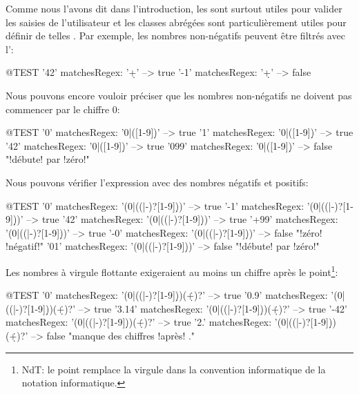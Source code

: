 \documentclass[a4paper,10pt,twoside]{book}
\begin{document}
{Comme nous l'avons dit dans l'introduction, les \expregs sont surtout
utiles pour valider les saisies de l'utilisateur et les classes
abrégées sont particulièrement utiles pour définir de telles \expregs.
Par exemple, les nombres non-négatifs peuvent être filtrés avec
l'\expreg \ct{\d+}:

\begin{code}{@TEST}
'42' matchesRegex: '\d+' --> true
'-1' matchesRegex: '\d+' --> false
\end{code}

Nous pouvons encore vouloir préciser que les nombres non-négatifs ne
doivent pas commencer par le chiffre 0:

\begin{code}{@TEST}
'0' matchesRegex: '0|([1-9]\d*)'     --> true
'1' matchesRegex: '0|([1-9]\d*)'     --> true
'42' matchesRegex: '0|([1-9]\d*)'   --> true
'099' matchesRegex: '0|([1-9]\d*)' --> false    "!débute! par !zéro!"
\end{code}

Nous pouvons vérifier l'expression avec des nombres négatifs et positifs:

\begin{code}{@TEST}
'0' matchesRegex: '(0|((\+|-)?[1-9]\d*))'     --> true
'-1' matchesRegex: '(0|((\+|-)?[1-9]\d*))'   --> true
'42' matchesRegex: '(0|((\+|-)?[1-9]\d*))'   --> true
'+99' matchesRegex: '(0|((\+|-)?[1-9]\d*))' --> true
'-0' matchesRegex: '(0|((\+|-)?[1-9]\d*))'   --> false    "!zéro! !négatif!"
'01' matchesRegex: '(0|((\+|-)?[1-9]\d*))'   --> false    "!débute! par !zéro!"
\end{code}

Les nombres à virgule flottante exigeraient au moins un chiffre après
le point\footnote{NdT: le point remplace la virgule dans la convention
  informatique de la notation informatique.}: 

\begin{code}{@TEST}
'0' matchesRegex: '(0|((\+|-)?[1-9]\d*))(\.\d+)?'      --> true
'0.9' matchesRegex: '(0|((\+|-)?[1-9]\d*))(\.\d+)?'   --> true
'3.14' matchesRegex: '(0|((\+|-)?[1-9]\d*))(\.\d+)?' --> true
'-42' matchesRegex: '(0|((\+|-)?[1-9]\d*))(\.\d+)?'  --> true
'2.' matchesRegex: '(0|((\+|-)?[1-9]\d*))(\.\d+)?'     --> false "manque des chiffres !après! ."
\end{code}

}
\end{document}
